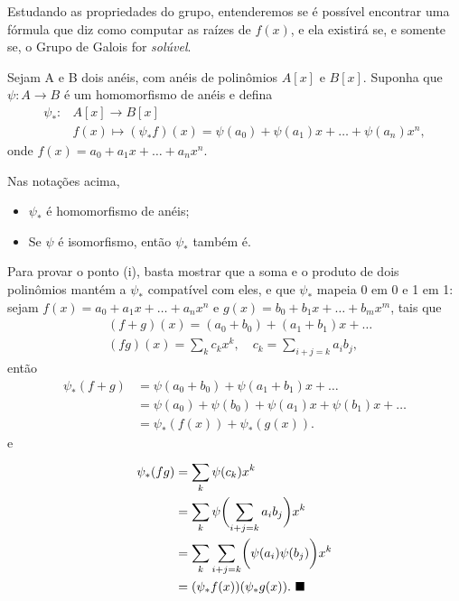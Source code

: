 \documentclass[../algebraIII_notes.tex]{subfiles}
\begin{document}
Estudando as propriedades do grupo, entenderemos se é possível encontrar uma fórmula que diz como computar as raízes de \(f(x)\), e ela existirá se, e somente se, o Grupo de Galois for \textit{solúvel}.

Sejam A e B dois anéis, com anéis de polinômios \(A[x]\) e \(B[x]\). Suponha que \(\psi :A\rightarrow B\) é um homomorfismo de anéis e defina
\begin{align*}
	\psi_{*}: & A[x]\rightarrow B[x]                                                               \\
	          & f(x)\longmapsto (\psi_{*}f)(x)=\psi (a_{0})+\psi (a_1)x+\dotsc +\psi (a_{n})x^{n},
\end{align*}
onde \(f(x)=a_{0}+a_1x+\dotsc +a_{n}x^{n}\).
\begin{lemma*}
	Nas notações acima,
	\begin{itemize}
		\item[i)] \(\psi_{*}\) é homomorfismo de anéis;
		\item[ii)] Se \(\psi \) é isomorfismo, então \(\psi_{*}\) também é.
	\end{itemize}
\end{lemma*}
\begin{proof*}
	Para provar o ponto (i), basta mostrar que a soma e o produto de dois polinômios mantém a \(\psi_{*}\) compatível com eles, e que \(\psi_{*}\) mapeia 0 em 0 e 1 em 1: sejam \(f(x)=a_{0}+a_1x+\dotsc +a_{n}x^{n}\) e \(g(x)=b_{0}+b_1x+\dotsc +b_{m}x^{m}\), tais que
	\begin{align*}
		 & (f+g)(x)=(a_{0}+b_{0})+(a_1+b_1)x+\dotsc                                            \\
		 & (fg)(x)=\sum\limits_{k}^{}c_{k}x^{k}, \quad c_{k}=\sum\limits_{i+j=k}^{}a_{i}b_{j},
	\end{align*}
	então
	\begin{align*}
		\psi_{*}(f+g) & =\psi(a_{0}+b_{0})+\psi(a_1+b_1)x+\dotsc                  \\
		              & = \psi(a_{0})+\psi (b_{0})+\psi (a_1)x+\psi (b_1)x+\dotsc \\
		              & = \psi_{*}(f(x)) + \psi_{*}(g(x)).
	\end{align*}
	e
	\begin{align*}
		\psi_{*}(fg) & = \sum\limits_{k}^{}\psi (c_{k})x^{k}                                                \\
		             & = \sum\limits_{k}^{}\psi \biggl(\sum\limits_{i+j=k}^{}a_{i}b_{j}\biggr)x^{k}         \\
		             & = \sum\limits_{k}^{}\sum\limits_{i+j=k}^{}\biggl(\psi (a_{i})\psi(b_{j})\biggr)x^{k} \\
		             & = (\psi_{*}f(x))(\psi_{*}g(x)). \text{ $\blacksquare$}
	\end{align*}
\end{proof*}
\end{document}
